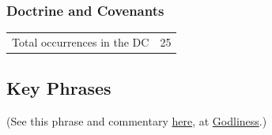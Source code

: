 	
		
		
	\subsubsection{Doctrine and Covenants} %
		\label{MYSTERY-DC}
	
		\begin{tabular}{ll}
			Total occurrences in the DC & 25
		\end{tabular}
		
		\begin{compactdesc}
			\item[{\hyperref[DC19-8]{DC 19:8}}]
			\item[{\hyperref[DC19-10]{DC 19:10}}]
		\end{compactdesc}
		
	
		
		
\subsection{Key Phrases} %
	\label{MYSTERY-PHRASES}

	\begin{compactdesc}
		\item[mystery of godliness] (See this phrase and commentary \hyperref[GODLINESS-PHRASES]{here}, at \hyperref[GODLINESS]{Godliness}.)
	\end{compactdesc}
	
